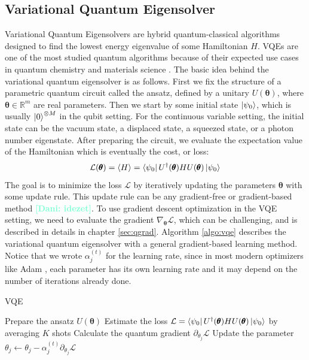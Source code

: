 \documentclass[12pt, a4paper,  nobibnotes]{article}
\newcommand{\nd}[1]{\textcolor{Aquamarine}{\textbf{[Dani: #1]}}}
\begin{document}
\subsection{Variational Quantum Eigensolver}
\label{sec:vqe}
Variational Quantum Eigensolvers \cite{Peruzzo2014} are hybrid quantum-classical algorithms designed to find the lowest energy eigenvalue of some Hamiltonian $H$. VQEs are one of the most studied quantum algorithms because of their expected use cases in quantum chemistry and
materials science \cite{Wei2020-QCHEM,VQE-HARTREE-FOCK,Kandala2017-VQE-QCHEM,PhysRevX-VQE-QCHEM}.
The basic idea behind the variational quantum eigensolver is as follows. 
First we fix the structure of a parametric quantum circuit called the ansatz, defined by a 
unitary $U(\pmb\theta)$, where $\pmb\theta\in\mathbb{R}^m$ are real parameters. 
Then we start by some initial state $\ket{\psi_0}$, which is usually $\ket 0^{\otimes M}$ 
in the qubit setting. For the continuous variable setting, the initial state can be the vacuum state,
a displaced state, a squeezed state, or a photon number eigenstate.
After preparing the circuit, we evaluate the expectation value of the Hamiltonian
which is eventually the cost, or loss:
\begin{equation}
    \mathcal L(\pmb\theta) = \langle H \rangle = \bra{\psi_0}U^{\dagger}(\pmb\theta)HU(\pmb\theta)\ket{\psi_0}
\end{equation}
The goal is to minimize the loss $\mathcal L$ by iteratively updating the parameters $\pmb\theta$ with some update rule. This update rule can be any gradient-free \cite{Zhu2019} or gradient-based method \nd{idezet}. To use gradient descent optimization in the VQE setting, we need to evaluate the gradient
$\nabla_{\pmb\theta}\mathcal L$, which can be challenging, and is described in details in chapter \ref{sec:qgrad}. Algorithm \ref{algo:vqe} describes 
the variational quantum eigensolver with a general gradient-based learning method. Notice that we wrote $\alpha_j^{(t)}$ for the learning rate, since in most modern optimizers like Adam \cite{Kingma2015AdamAM}, each parameter has its own learning rate and it may depend on the number of iterations already done.
\begin{algorithm}[H]
    \caption{VQE}
    \begin{algorithmic}[1]
            \State Prepare the ansatz $U(\pmb\theta)$
            \State Estimate the loss $\mathcal L = \bra{\psi_0}U^{\dagger}(\pmb\theta)HU(\pmb\theta)\ket{\psi_0}$ by averaging $K$ shots
                \State Calculate the quantum gradient $\partial_{\theta_j}\mathcal L$
                \State Update the parameter $\theta_j \leftarrow \theta_j - \alpha_j^{(t)}\partial_{\theta_j}\mathcal L$
            \EndFor
        \EndFor
    \EndProcedure
    \end{algorithmic}
    \label{algo:vqe}
\end{algorithm}
\end{document}
